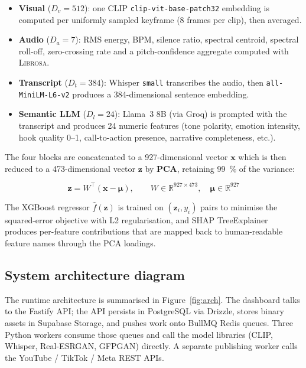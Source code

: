 \begin{itemize}
  \item \textbf{Visual} ($D_v = 512$): one CLIP \texttt{clip-vit-base-patch32} embedding is
        computed per uniformly sampled keyframe (8 frames per clip), then averaged.
  \item \textbf{Audio} ($D_a = 7$): RMS energy, BPM, silence ratio, spectral centroid,
        spectral roll-off, zero-crossing rate and a pitch-confidence aggregate computed with
        \textsc{Librosa}.
  \item \textbf{Transcript} ($D_t = 384$): Whisper \texttt{small} transcribes the audio,
        then \texttt{all-MiniLM-L6-v2} produces a 384-dimensional sentence embedding.
  \item \textbf{Semantic LLM} ($D_l = 24$): Llama~3 8B (via Groq) is prompted with the
        transcript and produces 24 numeric features (tone polarity, emotion intensity, hook
        quality 0--1, call-to-action presence, narrative completeness, etc.).
\end{itemize}

The four blocks are concatenated to a 927-dimensional vector $\mathbf{x}$ which is then
reduced to a 473-dimensional vector $\mathbf{z}$ by \textbf{PCA}, retaining 99~\% of the
variance:

\begin{equation}
  \mathbf{z} = W^{\!\top}(\mathbf{x} - \boldsymbol{\mu}),
  \qquad W \in \mathbb{R}^{927\times 473},
  \quad \boldsymbol{\mu} \in \mathbb{R}^{927}
  \label{eq:pca}
\end{equation}

The XGBoost regressor $\hat{f}(\mathbf{z})$ is trained on $(\mathbf{z}_i, y_i)$ pairs to
minimise the squared-error objective with L2 regularisation, and SHAP TreeExplainer produces
per-feature contributions that are mapped back to human-readable feature names through the
PCA loadings.

\subsection{System architecture diagram}
\label{sec:archdiag}

The runtime architecture is summarised in Figure~\ref{fig:arch}. The dashboard talks to the
Fastify API; the API persists in PostgreSQL via Drizzle, stores binary assets in Supabase
Storage, and pushes work onto BullMQ Redis queues. Three Python workers consume those queues
and call the model libraries (CLIP, Whisper, Real-ESRGAN, GFPGAN) directly. A separate
publishing worker calls the YouTube / TikTok / Meta REST APIs.

